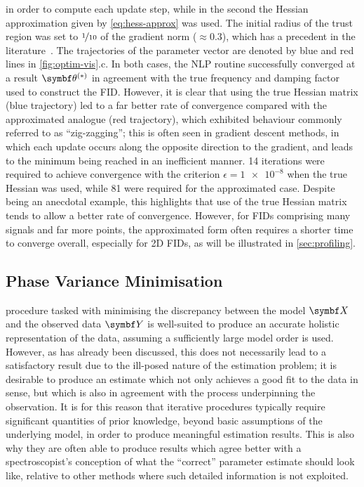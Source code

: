 in order to compute each update step, while in the second the Hessian
approximation given by \cref{eq:hess-approx} was used. The initial
radius of the trust region was set to $\nicefrac{1}{10}$ of the gradient norm
($\approx 0.3$), which has a precedent in the literature~\cite{Gould2005}. The
trajectories of the parameter vector are denoted by blue and red lines in
\cref{fig:optim-vis}.c.
In both cases, the \ac{NLP} routine successfully converged at a result $\bthstar$
in agreement with the true frequency and damping factor used to construct the
\ac{FID}. However, it is clear that using the true Hessian matrix (blue trajectory)
led to a far better rate of convergence compared with the
approximated analogue (red trajectory), which exhibited behaviour commonly
referred to as ``zig-zagging''; this is often seen in gradient
descent methods, in which each update occurs along the opposite direction to
the gradient, and leads to the minimum being reached in an inefficient manner.
14 iterations were required to achieve convergence with the
criterion $\epsilon = \num[print-unity-mantissa=false]{1e-8}$
when the true Hessian was used, while 81 were required for the approximated
case. Despite being an anecdotal example, this highlights that use of the true
Hessian matrix tends to allow a better rate of convergence. However, for
\acp{FID} comprising many signals and far more points, the approximated form
often requires a shorter time to converge overall, especially for \ac{2D}
\acp{FID}, as will be illustrated in \cref{sec:profiling}.

\begin{remark}
    \label{rem:awgn}
\end{remark}

\subsection{Phase Variance Minimisation}
\label{subsec:phase-variance}
 procedure tasked with minimising the discrepancy between the model
$\bX$ and the observed data $\bY$ is well-suited to produce an accurate
holistic
representation of the data, assuming a sufficiently large
model order is used. However, as has already been discussed, this does not
necessarily lead to a satisfactory result due to the ill-posed nature of the
estimation problem;
it is desirable to produce an estimate which not only achieves a good fit to
the data in  sense, but which is also in agreement with the process
underpinning the observation. It is for this reason that iterative procedures
typically require significant quantities of prior knowledge, beyond basic
assumptions of the underlying model, in order to produce meaningful estimation
results.  This is also why they are often able to produce results which agree
better with a spectroscopist's conception of what the ``correct'' parameter
estimate should look like, relative to other methods where such detailed
information is not exploited.

